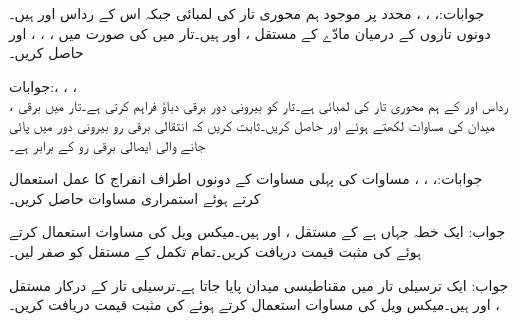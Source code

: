 جوابات:، ، ، 
محدد  پر موجود ہم محوری تار کی لمبائی  جبکہ اس کے رداس  اور  ہیں۔ دونوں تاروں کے درمیان مادّے کے مستقل ،  اور  ہیں۔تار میں  کی صورت میں ، ، ،  اور  حاصل کریں۔

جوابات:، ، 
، \\ ، 
رداس  اور  کے ہم محوری تار کی لمبائی  ہے۔تار  کو بیرونی دور  برقی دباؤ فراہم کرتی ہے۔تار میں برقی میدان  کی مساوات لکھتے ہوئے  اور  حاصل کریں۔ثابت کریں کہ انتقالی برقی رو بیرونی دور میں پائی جانے والی ایصالی برقی رو کے برابر ہے۔

جوابات:،
 ،
  ،
مساوات  کی پہلی مساوات کے دونوں اطراف انفراج کا عمل استعمال کرتے ہوئے  استمراری مساوات حاصل کریں۔

جواب: 
ایک خطہ جہاں  ہے کے مستقل ،  اور  ہیں۔میکس ویل کی مساوات استعمال کرتے ہوئے  کی مثبت قیمت دریافت کریں۔تمام تکمل کے مستقل کو صفر لیں۔

جواب:
ایک ترسیلی تار میں مقناطیسی میدان  پایا جاتا ہے۔ترسیلی تار کے درکار مستقل ،  اور  ہیں۔میکس ویل کی مساوات استعمال کرتے ہوئے  کی مثبت قیمت دریافت کریں۔

